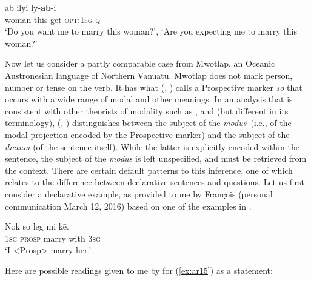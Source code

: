 \documentclass[output=paper]{langsci/langscibook}
\begin{document}
\begin{exe}
	\ex \label{ex:ar14}
	\gll ab ilyi ly-\textbf{ab}-i\\
	woman this get-\textsc{opt}:1\textsc{sg}-\textsc{q}\\
	\trans ‘Do you want me to marry this woman?’, ‘Are you expecting me to marry this woman?’
\end{exe}

Now let us consider a partly comparable case from Mwotlap, an Oceanic Austronesian language of Northern Vanuatu. Mwotlap does not mark person, number or tense on the verb. It has what \citeauthor{Francois2003} (\citeyear{Francois2003}, \citeyear{Francois2004}) calls a Prospective marker \textit{so} that occurs with a wide range of modal and other meanings.  In an analysis that is consistent with other theorists of modality such as \cite{Halliday1970}, \cite{Verstraete2005} and \cite{Lehmann2012} (but different in its terminology), \citeauthor{Francois2003} (\citeyear{Francois2003}, \citeyear{Francois2004}) distinguishes between the subject of the \textit{modus} (i.e., of the modal projection encoded by the Prospective marker) and the subject of the \textit{dictum} (of the sentence itself). While the latter is explicitly encoded within the sentence, the subject of the \textit{modus} is left unspecified, and must be retrieved from the context. There are certain default patterns to this inference, one of which relates to the difference between declarative sentences and questions. Let us first consider a declarative example, as provided to me by François (personal communication March 12, 2016) based on one of the examples in \cite[221]{Francois2003}.

\begin{exe}
	\ex \label{ex:ar15}
	\gll Nok so leg mi kē.\\
	1\textsc{sg} \textsc{prosp} marry with 3\textsc{sg}\\
	\trans ‘I <Prosp> marry her.’
\end{exe}

Here are possible readings given to me by \citeauthor{Francois2003} for (\ref{ex:ar15}) as a statement:
\end{document}
